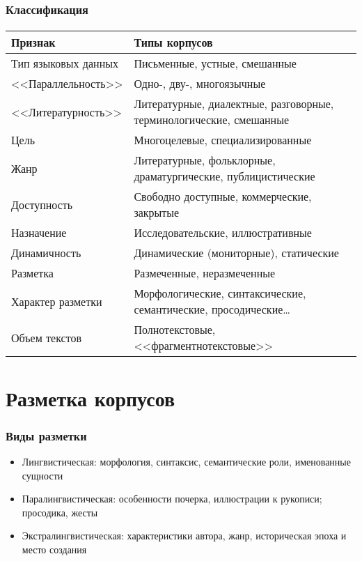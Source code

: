 \begin{frame}[allowframebreaks]
    \frametitle{Классификация}
    \framesubtitle{\autocite[21--22]{zakharov_bogdanova:2011}}

    \begin{tabularx}{\textwidth}{XX}
        Признак & Типы корпусов \\ \midrule \midrule
        Тип языковых данных & Письменные, устные, смешанные \\ \midrule
        <<Параллельность>> & Одно-, дву-, многоязычные \\ \midrule
        <<Литературность>> & Литературные, диалектные, разговорные, терминологические, смешанные \\ \midrule
        Цель & Многоцелевые, специализированные \\ \midrule
        Жанр & Литературные, фольклорные, драматургические, публицистические \\ \midrule
        Доступность & Свободно доступные, коммерческие, закрытые \\ \midrule
        Назначение & Исследовательские, иллюстративные \\ \midrule
        Динамичность & Динамические (мониторные), статические \\ \midrule
        Разметка & Размеченные, неразмеченные \\ \midrule
        Характер разметки & Морфологические, синтаксические, семантические, просодические\ldots \\ \midrule
        Объем текстов & Полнотекстовые, <<фрагментнотекстовые>> \\
    \end{tabularx}
\end{frame}

\section{Разметка корпусов}

\frame{\tableofcontents[currentsection]}

\begin{frame}
    \frametitle{Виды разметки}

    \begin{itemize}
        \item Лингвистическая: морфология, синтаксис, семантические роли, именованные сущности
        \item Паралингвистическая: особенности почерка, иллюстрации к рукописи; просодика, жесты
        \item Экстралингвистическая: характеристики автора, жанр, историческая эпоха и место создания
    \end{itemize}
\end{frame}

